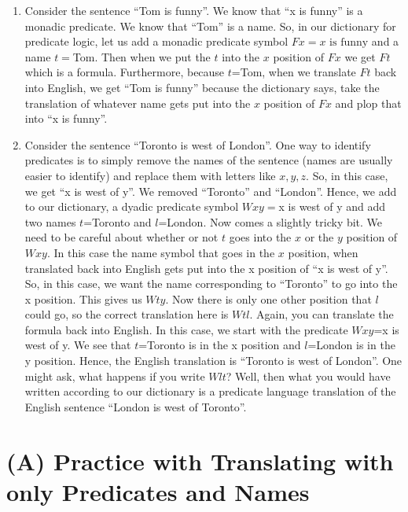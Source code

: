 \documentclass[
]{book}
\begin{document}
\begin{enumerate}
\def\labelenumi{\arabic{enumi}.}
\item
  Consider the sentence ``Tom is funny''. We know that ``x is funny'' is a monadic predicate. We know that ``Tom'' is a name. So, in our dictionary for predicate logic, let us add a monadic predicate symbol \(Fx = x \text{ is funny}\) and a name \(t=\)Tom. Then when we put the \(t\) into the \(x\) position of \(Fx\) we get \(Ft\) which is a formula. Furthermore, because \(t\)=Tom, when we translate \(Ft\) back into English, we get ``Tom is funny'' because the dictionary says, take the translation of whatever name gets put into the \(x\) position of \(Fx\) and plop that into ``x is funny''.
\item
  Consider the sentence ``Toronto is west of London''. One way to identify predicates is to simply remove the names of the sentence (names are usually easier to identify) and replace them with letters like \(x,y,z\). So, in this case, we get ``x is west of y''. We removed ``Toronto'' and ``London''. Hence, we add to our dictionary, a dyadic predicate symbol \(Wxy=\)x is west of y and add two names \(t\)=Toronto and \(l\)=London. Now comes a slightly tricky bit. We need to be careful about whether or not \(t\) goes into the \(x\) or the \(y\) position of \(Wxy\). In this case the name symbol that goes in the \(x\) position, when translated back into English gets put into the x position of ``x is west of y''. So, in this case, we want the name corresponding to ``Toronto'' to go into the x position. This gives us \(Wty\). Now there is only one other position that \(l\) could go, so the correct translation here is \(Wtl\). Again, you can translate the formula back into English. In this case, we start with the predicate \(Wxy\)=x is west of y. We see that \(t\)=Toronto is in the x position and \(l\)=London is in the y position. Hence, the English translation is ``Toronto is west of London''. One might ask, what happens if you write \(Wlt\)? Well, then what you would have written according to our dictionary is a predicate language translation of the English sentence ``London is west of Toronto''.
\end{enumerate}

\hypertarget{a-practice-with-translating-with-only-predicates-and-names}{%
\section{(A) Practice with Translating with only Predicates and Names}\label{a-practice-with-translating-with-only-predicates-and-names}}
\end{document}
